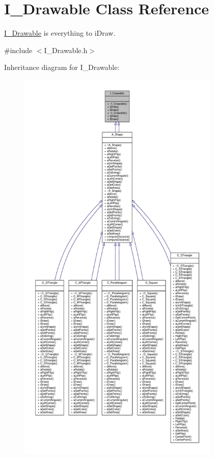 \hypertarget{classI__Drawable}{}\section{I\+\_\+\+Drawable Class Reference}
\label{classI__Drawable}


\hyperlink{classI__Drawable}{I\+\_\+\+Drawable} is everything to i\+Draw.  




{\ttfamily \#include $<$I\+\_\+\+Drawable.\+h$>$}



Inheritance diagram for I\+\_\+\+Drawable\+:\nopagebreak
\begin{figure}[H]
\begin{center}
\leavevmode
\includegraphics[height=550pt]{classI__Drawable__inherit__graph}
\end{center}
\end{figure}


